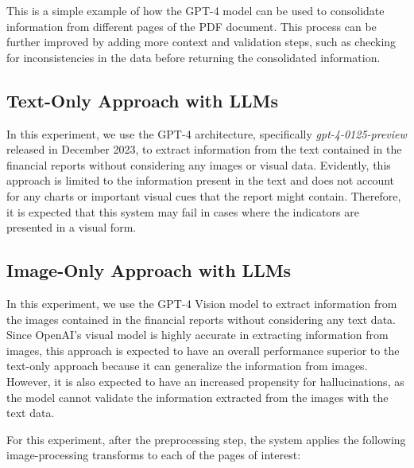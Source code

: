 \documentclass[english, 12pt, a4paper, elec, utf8, a-2b, online]{aaltothesis}
\begin{document}
This is a simple example of how the \ac{GPT}-4 model can be used to consolidate information from different pages of the \ac{PDF} document.
This process can be further improved by adding more context and validation steps, such as checking for inconsistencies in the data before returning the consolidated information.

\subsection{Text-Only Approach with LLMs}

In this experiment, we use the \ac{GPT}-4 architecture, specifically \textit{gpt-4-0125-preview} released in December 2023, to extract information from the text contained in the financial reports without considering any images or visual data.
Evidently, this approach is limited to the information present in the text and does not account for any charts or important visual cues that the report might contain.
Therefore, it is expected that this system may fail in cases where the indicators are presented in a visual form.

\subsection{Image-Only Approach with LLMs}

In this experiment, we use the \ac{GPT}-4 Vision model to extract information from the images contained in the financial reports without considering any text data.
Since OpenAI's visual model is highly accurate in extracting information from images, this approach is expected to have an overall performance superior to the text-only approach because it can generalize the information from images.
However, it is also expected to have an increased propensity for hallucinations, as the model cannot validate the information extracted from the images with the text data.

For this experiment, after the preprocessing step, the system applies the following image-processing transforms to each of the pages of interest:
\end{document}
